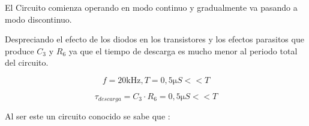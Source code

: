 
El Circuito comienza operando en modo continuo y gradualmente va pasando a modo discontinuo.


Despreciando el efecto de los diodos en los transistores y los efectos parasitos que produce $C_3$ y $R_6$ ya que el tiempo de descarga es mucho menor al periodo total del circuito. 


	\begin{equation}
		f = 20 \si{\kilo\Hz} , T = 0,5 \si{\micro}S << T
	\end{equation}


	\begin{equation}
		\si{\tau}_{descarga} = C_3 \cdot R_6 = 0,5 \si{\micro}S << T
	\end{equation}

Al ser este un circuito conocido se sabe que :






 














